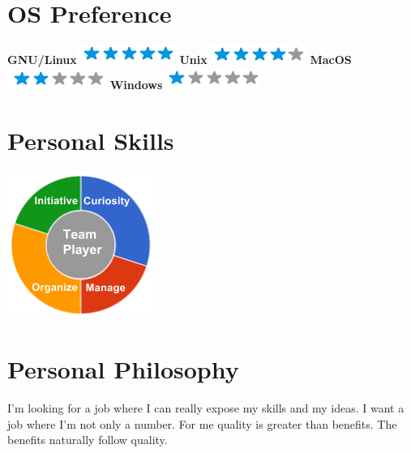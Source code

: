 \documentclass[]{friggeri-cv}
\begin{document}
\begin{aside}
  \section{OS Preference}
    \textbf{GNU/Linux}\includegraphics[scale=0.40]{img/5stars.png}
    \textbf{Unix}\includegraphics[scale=0.40]{img/4stars.png}
    \textbf{MacOS}\includegraphics[scale=0.40]{img/2stars.png}
    \textbf{Windows}\includegraphics[scale=0.40]{img/1stars.png}
    ~
  \section{Personal Skills}
    \includegraphics[scale=0.62]{img/personal.png}
    ~
\end{aside}

\section{Personal Philosophy}
    I'm looking for a job where I can really expose my skills and my ideas. I want a job where I'm not only a number.
    For me quality is greater than benefits. The benefits naturally follow quality.
\end{document}
